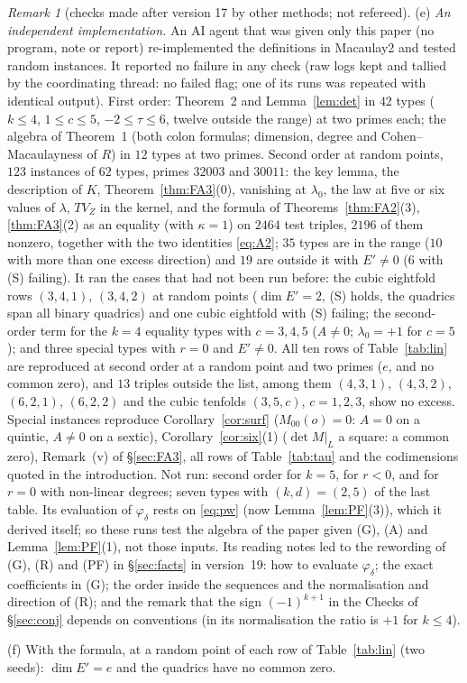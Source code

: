\documentclass[11pt]{article}
\numberwithin{equation}{section}
\theoremstyle{remark}
\newtheorem{remark}[theorem]{Remark}
\newcommand{\VZ}{V_Z}
\newcommand{\lz}{\lambda_0}
\begin{document}
\begin{remark}[checks made after version 17 by other methods; not refereed]
(e) \emph{An independent implementation.} An AI agent that was given only this paper (no program, note or report)
re-implemented the definitions in Macaulay2 and tested random instances. It reported no failure in any check (raw logs kept and tallied by the coordinating thread: no failed flag; one of
its runs was repeated with identical output). First order: Theorem~2 and Lemma~\ref{lem:det} in $42$ types
($k\le4$, $1\le c\le5$, $-2\le\tau\le6$, twelve outside the range) at two primes each; the algebra of Theorem~1
(both colon formulas; dimension, degree and Cohen--Macaulayness of $R$) in $12$ types at two primes. Second
order at random points, $123$ instances of $62$ types, primes $32003$ and $30011$: the key lemma, the description
of $K$, Theorem~\ref{thm:FA3}(0), vanishing at $\lz$, the law at five or six values of $\lambda$, $T\VZ$ in the
kernel, and the formula of Theorems~\ref{thm:FA2}(3), \ref{thm:FA3}(2) as an equality (with $\kappa=1$) on $2464$
test triples, $2196$ of them nonzero, together with the two identities \eqref{eq:A2}; $35$ types are in the range
($10$ with more than one excess direction) and $19$ are outside it with $E'\ne0$ ($6$ with (S) failing). It ran the
cases that had not been run before: the cubic eightfold rows $(3,4,1)$, $(3,4,2)$ at random points ($\dim E'=2$,
(S) holds, the quadrics span all binary quadrics) and one cubic eightfold with (S) failing; the second-order term
for the $k=4$ equality types with $c=3,4,5$ ($A\ne0$; $\lz=+1$ for $c=5$); and three special types with $r=0$ and
$E'\ne0$. All ten rows of Table~\ref{tab:lin} are reproduced at second order at a random point and two primes
($e$, and no common zero), and $13$ triples outside the list, among them $(4,3,1)$, $(4,3,2)$, $(6,2,1)$,
$(6,2,2)$ and the cubic tenfolds $(3,5,c)$, $c=1,2,3$, show no excess. Special instances reproduce
Corollary~\ref{cor:surf} ($M_{00}(o)=0$: $A=0$ on a quintic, $A\ne0$ on a sextic), Corollary~\ref{cor:six}(1)
($\det M|_L$ a square: a common zero), Remark~(v) of \S\ref{sec:FA3}, all rows of Table~\ref{tab:tau} and the
codimensions quoted in the introduction. Not run: second order for $k=5$, for $r<0$, and for $r=0$ with non-linear
degrees; seven types with $(k,d)=(2,5)$ of the last table. Its evaluation of $\varphi_\delta$ rests on
\eqref{eq:pw} (now Lemma~\ref{lem:PF}(3)), which it derived itself; so these runs test the algebra of the paper given (G), (A) and
Lemma~\ref{lem:PF}(1), not those inputs. Its reading notes led to the rewording of (G), (R) and (PF) in
\S\ref{sec:facts} in version~19: how to evaluate $\varphi_\delta$; the exact coefficients in (G); the order inside
the sequences and the normalisation and direction of (R); and the remark that the sign $(-1)^{k+1}$ in the Checks of
\S\ref{sec:conj} depends on conventions (in its normalisation the ratio is $+1$ for $k\le4$).

(f) With the formula, at a random point of each row of Table~\ref{tab:lin} (two seeds): $\dim E'=e$ and the
quadrics have no common zero.
\end{remark}
\end{document}
